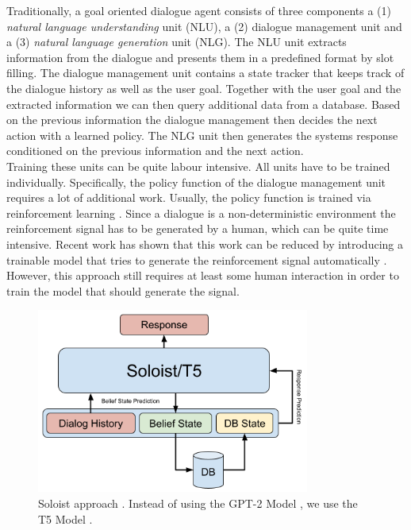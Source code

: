 \documentclass[twocolumn]{tum-article}
\begin{document}
Traditionally, a goal oriented dialogue agent consists of three components a (1) \textit{natural language understanding} unit (NLU), a (2) dialogue management unit and a (3) \textit{natural language generation} unit (NLG). The NLU unit extracts information from the dialogue and presents them in a predefined format by slot filling. The dialogue management unit contains a state tracker that keeps track of the dialogue history as well as the user goal. Together with the user goal and the extracted information we can then query additional data from a database. Based on the previous information the dialogue management then decides the next action with a learned policy. The NLG unit then generates the systems response conditioned on the previous information and the next action.\\
Training these units can be quite labour intensive. All units have to be trained individually. Specifically, the policy function of the dialogue management unit requires a lot of additional work. Usually, the policy function is trained via reinforcement learning \cite{DBLP:journals/ml/Williams92}. Since a dialogue is a non-deterministic environment the reinforcement signal has to be generated by a human, which can be quite time intensive. Recent work has shown that this work can be reduced by introducing a trainable model that tries to generate the reinforcement signal automatically \cite{DBLP:journals/corr/abs-1907-00448}. However, this approach still requires at least some human interaction in order to train the model that should generate the signal.\\
\begin{figure}[!h]
\centering
\includegraphics[width=0.8\textwidth]{figures/Soloist.png}
\caption{Soloist approach \cite{peng2020soloist}. Instead of using the GPT-2 Model \cite{radford2019language}, we use the T5 Model \cite{raffel2019exploring}.}
\label{fig:soloist}
\end{figure}
\end{document}
